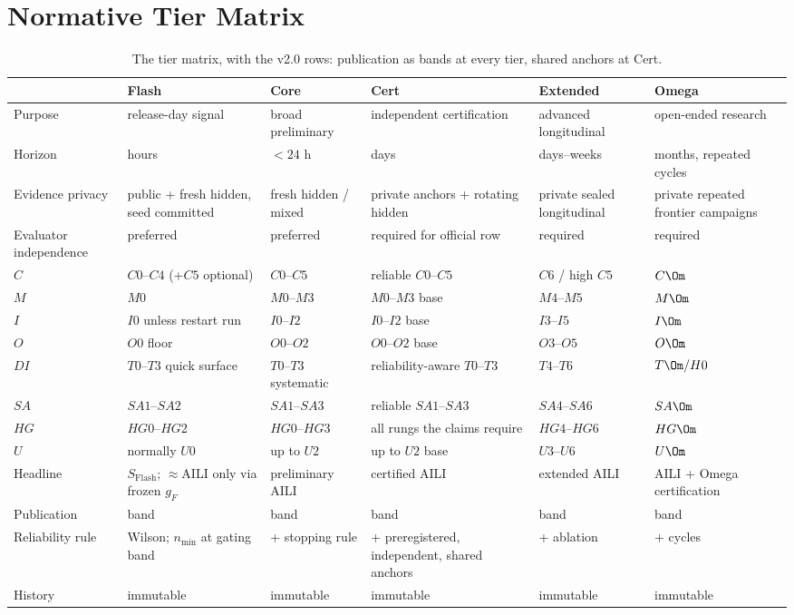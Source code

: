 \appendix

\section{Normative Tier Matrix}\label{app:matrix}
\begin{table}[H]
\centering\scriptsize
\begin{tabularx}{\textwidth}{@{}l Y Y Y Y Y@{}}
\toprule
 & Flash & Core & Cert & Extended & Omega \\
\midrule
Purpose & release-day signal & broad preliminary & independent certification & advanced longitudinal & open-ended research \\
Horizon & hours & $<24$ h & days & days--weeks & months, repeated cycles \\
Evidence privacy & public + fresh hidden, seed committed & fresh hidden / mixed & private anchors + rotating hidden & private sealed longitudinal & private repeated frontier campaigns \\
Evaluator independence & preferred & preferred & required for official row & required & required \\
$C$ & $C0$--$C4$ (+$C5$ optional) & $C0$--$C5$ & reliable $C0$--$C5$ & $C6$ / high $C5$ & $C\Om$ \\
$M$ & $M0$ & $M0$--$M3$ & $M0$--$M3$ base & $M4$--$M5$ & $M\Om$ \\
$I$ & $I0$ unless restart run & $I0$--$I2$ & $I0$--$I2$ base & $I3$--$I5$ & $I\Om$ \\
$O$ & $O0$ floor & $O0$--$O2$ & $O0$--$O2$ base & $O3$--$O5$ & $O\Om$ \\
$DI$ & $T0$--$T3$ quick surface & $T0$--$T3$ systematic & reliability-aware $T0$--$T3$ & $T4$--$T6$ & $T\Om/H0$ \\
$SA$ & $SA1$--$SA2$ & $SA1$--$SA3$ & reliable $SA1$--$SA3$ & $SA4$--$SA6$ & $SA\Om$ \\
$HG$ & $HG0$--$HG2$ & $HG0$--$HG3$ & all rungs the claims require & $HG4$--$HG6$ & $HG\Om$ \\
$U$ & normally $U0$ & up to $U2$ & up to $U2$ base & $U3$--$U6$ & $U\Om$ \\
Headline & $S_{\mathrm{Flash}}$; $\approx$AILI only via frozen $g_F$ & preliminary AILI & certified AILI & extended AILI & AILI + Omega certification \\
Publication & band & band & band & band & band \\
Reliability rule & Wilson; $n_{\min}$ at gating band & + stopping rule & + preregistered, independent, shared anchors & + ablation & + cycles \\
History & immutable & immutable & immutable & immutable & immutable \\
\bottomrule
\end{tabularx}
\caption{The tier matrix, with the v2.0 rows: publication as bands at every tier, shared anchors at Cert.}
\end{table}

